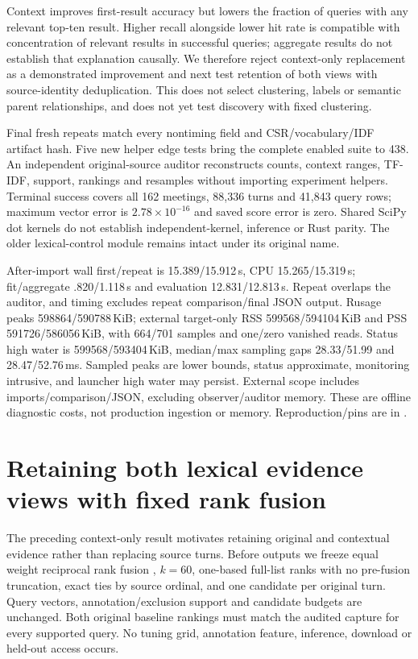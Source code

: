\documentclass[11pt]{article}
\begin{document}
Context improves first-result accuracy but lowers the fraction of queries with
any relevant top-ten result. Higher recall alongside lower hit rate is compatible
with concentration of relevant results in successful queries; aggregate results
do not establish that explanation causally. We therefore reject context-only
replacement as a demonstrated improvement and next test retention of both views
with source-identity deduplication. This does not select clustering, labels or
semantic parent relationships, and does not yet test discovery with fixed
clustering.

Final fresh repeats match every nontiming field and CSR/vocabulary/IDF artifact
hash. Five new helper edge tests bring the complete enabled suite to 438.
An independent original-source auditor reconstructs counts, context ranges,
TF-IDF, support, rankings and resamples without importing experiment helpers.
Terminal success covers all 162 meetings, 88,336 turns and 41,843 query rows;
maximum vector error is $2.78\times10^{-16}$ and saved score error is zero.
Shared SciPy dot
kernels do not establish independent-kernel, inference or Rust parity.
The older lexical-control module remains intact under its original name.

After-import wall first/repeat is 15.389/15.912\,s, CPU 15.265/15.319\,s;
fit/aggregate .820/1.118\,s and evaluation 12.831/12.813\,s. Repeat overlaps the
auditor, and timing excludes repeat comparison/final JSON output. Rusage peaks
598864/590788\,KiB; external target-only RSS 599568/594104\,KiB and PSS
591726/586056\,KiB, with 664/701 samples and one/zero vanished reads.
Status high water is 599568/593404\,KiB, median/max sampling gaps
28.33/51.99 and 28.47/52.76\,ms. Sampled peaks are lower bounds, status
approximate, monitoring intrusive, and launcher high water may persist.
External scope includes imports/comparison/JSON, excluding observer/auditor
memory. These are offline diagnostic costs, not production ingestion or memory.
Reproduction/pins are in
.

\section{Retaining both lexical evidence views with fixed rank fusion}
The preceding context-only result motivates retaining original and contextual
evidence rather than replacing source turns. Before outputs we freeze equal
weight reciprocal rank fusion \cite{rrf2009}, $k=60$, one-based full-list
ranks with no pre-fusion truncation, exact ties by source ordinal, and one
candidate per original turn. Query vectors, annotation/exclusion support and
candidate budgets are unchanged. Both original baseline rankings must match
the audited capture for every supported query. No tuning grid, annotation
feature, inference, download or held-out access occurs.
\end{document}
